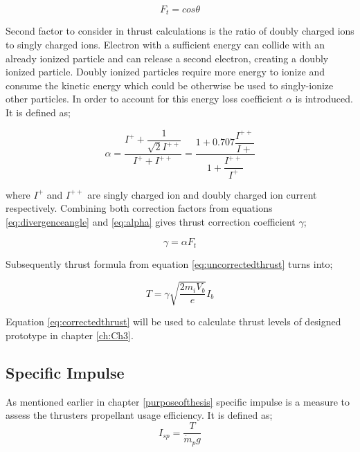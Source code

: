 \begin{equation}
    F_t = cos\theta
    \label{eq:divergenceangle}
\end{equation}

Second factor to consider in thrust calculations is the ratio of doubly charged ions to singly charged ions. Electron with a sufficient energy can collide with an already ionized particle
and can release a second electron, creating a doubly ionized particle. Doubly ionized particles require more energy to ionize and consume the kinetic energy which could be otherwise be used to singly-ionize other particles. In order to account for this energy loss coefficient $\alpha$ is introduced. It is defined as\cite{goebel2008fundamentals};

\begin{equation}
    \alpha = \frac{I^+ + \dfrac{1}{\sqrt{2}I^{++}}}{I^+ + I^{++}} =  \frac{1+0.707\dfrac{I^{++}}{I+}}{1+\dfrac{I^{++}}{I^+}}
    \label{eq:alpha}
\end{equation}

where $I^+$ and $I^{++}$ are singly charged ion and doubly charged ion current respectively. Combining both correction factors from equations \ref{eq:divergenceangle} and \ref{eq:alpha} gives thrust correction coefficient $\gamma$;

\begin{equation}
    \gamma = \alpha F_t 
    \label{eq:gamma}
\end{equation}

Subsequently thrust formula from equation \ref{eq:uncorrectedthrust} turns into;

\begin{equation}
    T = \gamma \sqrt{\dfrac{2m_i V_b}{e}}I_b
    \label{eq:correctedthrust}
\end{equation}

Equation \ref{eq:correctedthrust} will be used to calculate thrust levels of designed prototype in chapter \ref{ch:Ch3}.

\subsection{Specific Impulse}
As mentioned earlier in chapter \ref{purposeofthesis} specific impulse is a measure to assess the thrusters propellant usage efficiency. It is defined as\cite{goebel2008fundamentals};
\begin{equation}
    I_{sp} = \frac{T}{\dot{m}_p g}
    \label{eq:specimpulse}
\end{equation}

